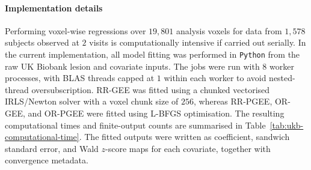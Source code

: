 \paragraph{Implementation details}{
Performing voxel-wise regressions over $19{,}801$ analysis voxels for data from $1{,}578$ subjects observed at $2$ visits is computationally intensive if carried out serially. In the current implementation, all model fitting was performed in \texttt{Python} from the raw UK Biobank lesion and covariate inputs. The jobs were run with $8$ worker processes, with BLAS threads capped at $1$ within each worker to avoid nested-thread oversubscription. RR-GEE was fitted using a chunked vectorised IRLS/Newton solver with a voxel chunk size of $256$, whereas RR-PGEE, OR-GEE, and OR-PGEE were fitted using L-BFGS optimisation. The resulting computational times and finite-output counts are summarised in Table~\ref{tab:ukb-computational-time}. The fitted outputs were written as coefficient, sandwich standard error, and Wald $z$-score maps for each covariate, together with convergence metadata.
}

